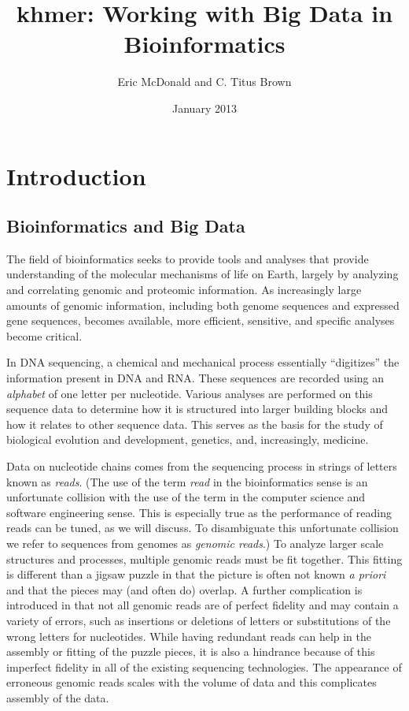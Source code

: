 \documentclass{article}
\title{khmer: Working with Big Data in Bioinformatics}
\author{Eric McDonald and C. Titus Brown}
\date{January 2013}
\begin{document}
\maketitle

\section{Introduction}

\subsection{Bioinformatics and Big Data}

The field of bioinformatics seeks to provide tools and analyses that
provide understanding of the molecular mechanisms of life on Earth,
largely by analyzing and correlating genomic and proteomic information.
As increasingly large amounts of genomic information, including both
genome sequences and expressed gene sequences, becomes available,
more efficient, sensitive, and specific analyses become critical.

In DNA sequencing, a chemical and mechanical process essentially
``digitizes'' the information present in DNA and RNA. These sequences
are recorded using an \textit{alphabet} of one letter per
nucleotide. Various analyses are performed on this sequence data to
determine how it is structured into larger building blocks and how it
relates to other sequence data. This serves as the basis for the study
of biological evolution and development, genetics, and, increasingly,
medicine.

Data on nucleotide chains comes from the sequencing process in strings of
letters known as \textit{reads}. (The use of the term \textit{read} in the
bioinformatics sense is an unfortunate collision with the use of the term in
the computer science and software engineering sense. This is especially true as
the performance of reading reads can be tuned, as we will discuss. To
disambiguate this unfortunate collision we refer to sequences from genomes as
\textit{genomic reads}.) To analyze larger scale structures and processes,
multiple genomic reads must be fit together. This fitting is different than a
jigsaw puzzle in that the picture is often not known \textit{a priori} and that
the pieces may (and often do) overlap. A further complication is introduced in
that not all genomic reads are of perfect fidelity and may contain a variety of
errors, such as insertions or deletions of letters or substitutions of the
wrong letters for nucleotides. While having redundant reads can help in the
assembly or fitting of the puzzle pieces, it is also a hindrance because of
this imperfect fidelity in all of the existing sequencing technologies. The
appearance of erroneous genomic reads scales with the volume of data and this
complicates assembly of the data.
\end{document}
